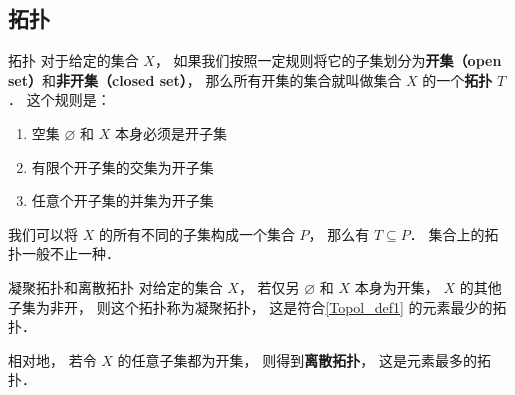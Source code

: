 

\subsection{拓扑}

\begin{definition}{拓扑}\label{Topol_def1}
对于给定的集合 $X$， 如果我们按照一定规则将它的子集划分为\textbf{开集（open set）}和\textbf{非开集（closed set）}， 那么所有开集的集合就叫做集合 $X$ 的一个\textbf{拓扑} $T$． 这个规则是：
\begin{enumerate}
\item 空集 $\varnothing$ 和 $X$ 本身必须是开子集
\item 有限个开子集的交集为开子集
\item 任意个开子集的并集为开子集
\end{enumerate}
\end{definition}

我们可以将 $X$ 的所有不同的子集构成一个集合 $P$， 那么有 $T \subseteq P$． 集合上的拓扑一般不止一种．

\begin{example}{凝聚拓扑和离散拓扑}
对给定的集合 $X$， 若仅另 $\varnothing$ 和 $X$ 本身为开集， $X$ 的其他子集为非开， 则这个拓扑称为凝聚拓扑， 这是符合\autoref{Topol_def1} 的元素最少的拓扑．

相对地， 若令 $X$ 的任意子集都为开集， 则得到\textbf{离散拓扑}， 这是元素最多的拓扑．
\end{example}
